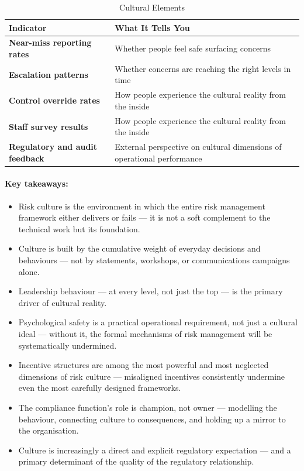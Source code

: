 \begin{table}[H]
  \centering
  \renewcommand{\arraystretch}{1.5}
  \begin{tabularx}{\textwidth}{ | >{\raggedright\arraybackslash}p{} 
                                | >{\raggedright\arraybackslash}X | }
    \hline
    \textbf{Indicator} & \textbf{What It Tells You} \\
    \hline
    \textbf{Near-miss reporting rates} & Whether people feel safe surfacing concerns\\
    \hline
    \textbf{Escalation patterns} & Whether concerns are reaching the right levels in time\\
    \hline
    \textbf{Control override rates} & How people experience the cultural reality from the inside\\
    \hline
    \textbf{Staff survey results} & How people experience the cultural reality from the inside\\
    \hline
    \textbf{Regulatory and audit feedback} & External perspective on cultural dimensions of operational performance\\
    \hline
  \end{tabularx}
  \caption{Cultural Elements}
\end{table}

\paragraph{Key takeaways:}
\begin{itemize}
  \item{Risk culture is the environment in which the entire risk management framework either delivers or fails — it is not a soft complement to the technical work but its foundation.}
  \item{Culture is built by the cumulative weight of everyday decisions and behaviours — not by statements, workshops, or communications campaigns alone.}
  \item{Leadership behaviour — at every level, not just the top — is the primary driver of cultural reality.}
  \item{Psychological safety is a practical operational requirement, not just a cultural ideal — without it, the formal mechanisms of risk management will be systematically undermined.}
  \item{Incentive structures are among the most powerful and most neglected dimensions of risk culture — misaligned incentives consistently undermine even the most carefully designed frameworks.}
  \item{The compliance function's role is champion, not owner — modelling the behaviour, connecting culture to consequences, and holding up a mirror to the organisation.}
  \item{Culture is increasingly a direct and explicit regulatory expectation — and a primary determinant of the quality of the regulatory relationship.}
\end{itemize}

